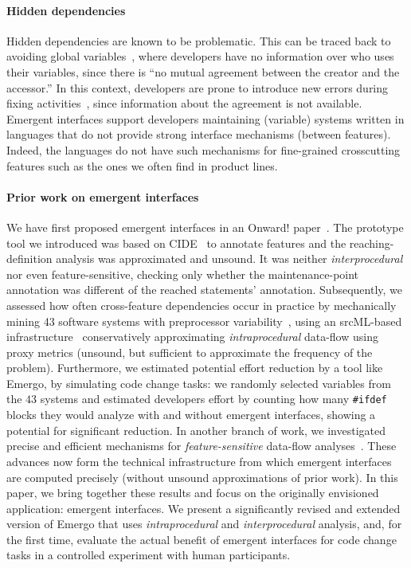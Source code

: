 \paragraph{Hidden dependencies}
Hidden dependencies are known to be problematic. This can be traced back to avoiding global variables~\cite{mary-shaw-global-variable-harmful-73}, where developers have no information over who uses their variables, since there is ``no mutual agreement between the creator and the accessor.'' In this context, developers are prone to introduce new errors during fixing activities~\cite{yin-fixes-become-bugs-fse11}, since information about the agreement is not available. Emergent interfaces support developers maintaining (variable) systems written in languages that do not provide strong interface mechanisms (between features). Indeed, the languages do not have such mechanisms for fine-grained crosscutting features such as the ones we often find in product lines.

\paragraph{Prior work on emergent interfaces}
We have first proposed emergent interfaces in an Onward! paper~\cite{ribeiro-emergent-onward10}. The prototype tool we introduced was based on CIDE~\cite{christian-cide-icse08} to annotate features and the reaching-definition analysis was approximated and unsound. It was neither \textit{interprocedural} nor even feature-sensitive, checking only whether the maintenance-point annotation was different of the reached statements' annotation. Subsequently, we assessed how often cross-feature dependencies occur in practice by mechanically mining 43 software systems with preprocessor variability~\cite{ribeiro-feature-dependencies-gpce11}, using an srcML-based infrastructure~\cite{liebig-40spls-icse10} conservatively approximating \textit{intraprocedural} data-flow using proxy metrics (unsound, but sufficient to approximate the frequency of the problem). Furthermore, we estimated potential effort reduction by a tool like Emergo, by  simulating code change tasks: we randomly selected variables from the $43$ systems and estimated developers effort by counting how many \texttt{\#ifdef} blocks they would analyze with and without emergent interfaces, showing a potential for significant reduction. 
In another branch of work, we investigated precise and efficient mechanisms for \emph{feature-sensitive} data-flow analyses~\cite{brabrand-dfa4spl-aosd12, brabrand-dfa4spl-taosd12, bodden-ifds4spl-pldi13}. These advances now form the technical infrastructure from which emergent interfaces are computed precisely (without unsound approximations of prior work).
In this paper, we bring together these results and focus on the originally envisioned application: emergent interfaces. We present a significantly revised and extended version of Emergo that uses \textit{intraprocedural} and \textit{interprocedural} analysis, and, for the first time, evaluate the actual benefit of emergent interfaces for code change tasks in a controlled experiment with human participants.

